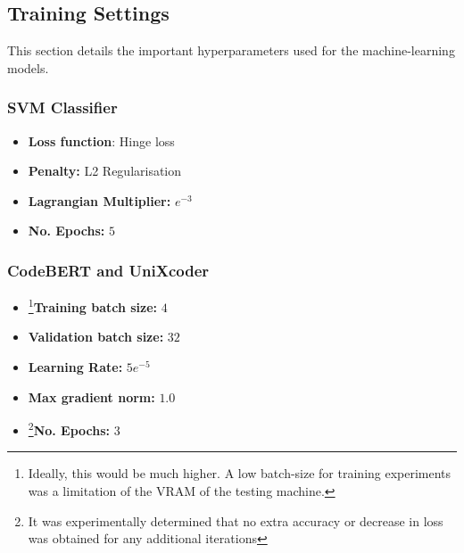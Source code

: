 
\subsection{Training Settings}

This section details the important hyperparameters used for the machine-learning models.

\subsubsection{SVM Classifier}

\begin{itemize}
    \item \textbf{Loss function}: Hinge loss
    \item \textbf{Penalty:} L2 Regularisation
    \item \textbf{Lagrangian Multiplier:} $e^{-3}$
    \item \textbf{No. Epochs:} $5$
\end{itemize}

\subsubsection{CodeBERT and UniXcoder}

\begin{itemize}
    \item \footnote{Ideally, this would be much higher. A low batch-size for training experiments was a limitation of the VRAM of the testing machine.}\textbf{Training batch size:} $4$
    \item \textbf{Validation batch size:} $32$
    \item \textbf{Learning Rate: } $5e^{-5}$
    \item \textbf{Max gradient norm: } $1.0$
    \item \footnote{It was experimentally determined that no extra accuracy or decrease in loss was obtained for any additional iterations}\textbf{No. Epochs:} $3$
\end{itemize}


    	
